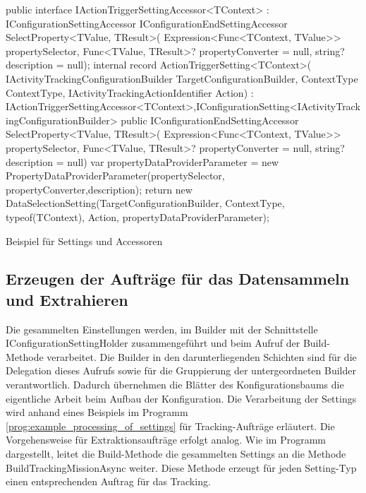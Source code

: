 \begin{program}[H]
\begin{CsCode}
public interface IActionTriggerSettingAccessor<TContext> : IConfigurationSettingAccessor{
    IConfigurationEndSettingAccessor SelectProperty<TValue, TResult>(
        Expression<Func<TContext, TValue>> propertySelector,
        Func<TValue, TResult>? propertyConverter = null,
        string? description = null);
}
internal record ActionTriggerSetting<TContext>(
    IActivityTrackingConfigurationBuilder TargetConfigurationBuilder,
    ContextType ContextType,
    IActivityTrackingActionIdentifier Action) : IActionTriggerSettingAccessor<TContext>,IConfigurationSetting<IActivityTrackingConfigurationBuilder>
    {
    public IConfigurationEndSettingAccessor SelectProperty<TValue, TResult>(
        Expression<Func<TContext, TValue>> propertySelector,
        Func<TValue, TResult>? propertyConverter = null,
        string? description = null){
        var propertyDataProviderParameter = new PropertyDataProviderParameter(propertySelector, propertyConverter,description);
        return new DataSelectionSetting(TargetConfigurationBuilder, ContextType, 
                                        typeof(TContext), Action,
                                        propertyDataProviderParameter);
    }
}
\end{CsCode}
\caption{Beispiel für Settings und Accessoren}
\label{prog:example_setting_with_accessor}
\end{program}

\subsection{Erzeugen der Aufträge für das Datensammeln und Extrahieren}
Die gesammelten Einstellungen werden, im Builder mit der Schnittstelle IConfigurationSettingHolder zusammengeführt und beim Aufruf der Build-Methode verarbeitet. Die Builder in den darunterliegenden Schichten sind für die Delegation dieses Aufrufs sowie für die Gruppierung der untergeordneten Builder verantwortlich. Dadurch übernehmen die Blätter des Konfigurationsbaums die eigentliche Arbeit beim Aufbau der Konfiguration. Die Verarbeitung der Settings wird anhand eines Beispiels im Programm \ref{prog:example_processing_of_settings} für Tracking-Aufträge erläutert. Die Vorgehensweise für Extraktionsaufträge erfolgt analog. Wie im Programm dargestellt, leitet die Build-Methode die gesammelten Settings an die Methode BuildTrackingMissionAsync weiter. Diese Methode erzeugt für jeden Setting-Typ einen entsprechenden Auftrag für das Tracking.

